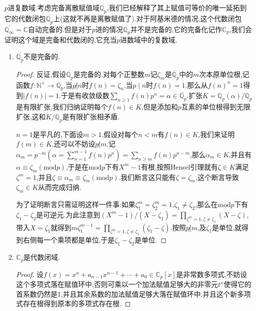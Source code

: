 $p$进复数域.考虑完备离散赋值域$\mathbb{Q}_p$,我们已经解释了其上赋值可等价的唯一延拓到它的代数闭包$\overline{\mathbb{Q}_p}$上(这就不再是离散赋值了).对于阿基米德的情况,这个代数闭包$\overline{\mathbb{Q}_{\infty}}=\mathbb{C}$自动完备的.但是对于$p$进的情况$\overline{\mathbb{Q}_p}$并不是完备的,它的完备化记作$\mathbb{C}_p$,我们会证明这个域是完备和代数闭的,它充当$p$进数域中的复数域.
\begin{enumerate}
	\item $\overline{\mathbb{Q}_p}$不是完备的.
	\begin{proof}
		
		反证,假设$\overline{\mathbb{Q}_p}$是完备的.对每个正整数$m$记$\zeta_m$是$\overline{\mathbb{Q}_p}$中的$m$次本原单位根,记函数$f:\mathbb{N}^+\to\overline{\mathbb{Q}_p}$,当$p\not|n$时$f(n)=\zeta_n$,当$p\mid n$时$f(n)=1$.那么从$f(n)^n=1$得到$|f(n)|=1$.于是有收敛级数$\sum_{n\ge1}f(n)p^n=\alpha\in\overline{\mathbb{Q}_p}$.扩张$K=\mathbb{Q}_p(\alpha)/\mathbb{Q}_p$是有限扩张,我们归纳证明每个$f(n)\in K$,但是添加和$p$互素的单位根得到无限扩张,这和$K/\mathbb{Q}_p$是有限扩张相矛盾.
		
		\qquad
		
		$n=1$是平凡的,下面设$m>1$,假设对每个$n<m$有$f(n)\in K$,我们来证明$f(m)\in K$.还可以不妨设$p\not|m$.记$\alpha_m=p^{-m}\left(\alpha=\sum_{n=1}^{m-1}f(n)p^n\right)=\sum_{n\ge m}f(n)p^{n-m}$,那么$\alpha_m\in K$,并且有$\alpha\equiv\zeta_m(\mathrm{mod}p)$,于是在$\mathrm{mod}p$下有$X^m-1$有根,按照Hensel引理就有$\zeta\in K$满足$\zeta^m=1$,并且$\zeta\equiv\alpha_m\equiv\zeta_m(\mathrm{mod}p)$.我们断言这只能有$\zeta=\zeta_m$,这个断言导致$\zeta_m\in K$从而完成归纳.
		
		\qquad
		
		为了证明断言只需证明这样一件事:如果$\zeta_1^m=\zeta_2^m=1$,$\zeta_1\not=\zeta_2$,那么在$\mathrm{mod}p$下有$\zeta_1-\zeta_2$是可逆元.为此注意到$(X^m-1)/(X-\zeta_1)=\prod_{\zeta^m=1,\zeta\not=\zeta_1}(X-\zeta)$,带入$X=\zeta_1$就得到$m\zeta_1^{m-1}=\prod_{\zeta^m=1,\zeta\not=\zeta_1}(\zeta_1-\zeta)$.按照$p\not|m$,及$\zeta_1$是单位,就得到右侧每一个乘项都是单位,于是$\zeta_1-\zeta_2$是单位.
	\end{proof}
	\item $\mathbb{C}_p$是代数闭域.
	\begin{proof}
		
		设$f(x)=x^n+a_{n-1}x^{n-1}+\cdots+a_0\in\mathbb{C}_p[x]$是非常数多项式,不妨设这个多项式落在赋值环中,否则可乘以一个加法赋值足够大的非零元$t^n$使得它的首系数仍然是1,并且其余系数的加法赋值足够大落在赋值环中.并且这个新多项式存在根得到原本的多项式存在根.
		

\end{proof}
\end{enumerate}
